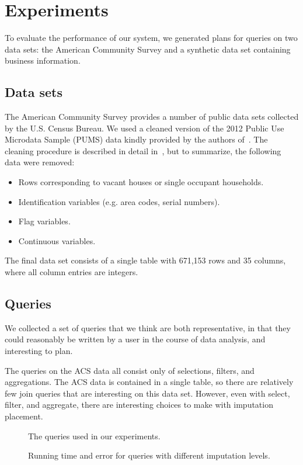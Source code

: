 \section{Experiments}

To evaluate the performance of our system, we generated plans for queries on two data sets: the American Community Survey and a synthetic data set containing business information.

\subsection{Data sets}

The American Community Survey provides a number of public data sets collected by the U.S. Census Bureau.
We used a cleaned version of the 2012 Public Use Microdata Sample (PUMS) data kindly provided by the authors of~\cite{akande2015empirical}.
The cleaning procedure is described in detail in~\cite{akande2015empirical}, but to summarize, the following data were removed:
\begin{itemize}
\item Rows corresponding to vacant houses or single occupant households.
\item Identification variables (e.g. area codes, serial numbers).
\item Flag variables.
\item Continuous variables.
\end{itemize}
The final data set consists of a single table with 671,153 rows and 35 columns, where all column entries are integers.


\subsection{Queries}

We collected a set of queries that we think are both representative, in that they could reasonably be written by a user in the course of data analysis, and interesting to plan.

The queries on the ACS data all consist only of selections, filters, and aggregations.
The ACS data is contained in a single table, so there are relatively few join queries that are interesting on this data set.
However, even with select, filter, and aggregate, there are interesting choices to make with imputation placement.

\begin{figure}
  \centerfloat
  
  \caption{The queries used in our experiments.}
\end{figure}

\begin{figure}
  \centerfloat
  
  \caption{Running time and error for queries with different imputation levels.}
\end{figure}


